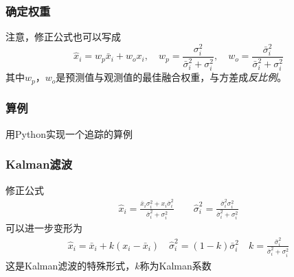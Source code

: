 \documentclass[14pt]{beamer}
\begin{document}
\begin{frame}
  \frametitle{确定权重}
  注意，修正公式也可以写成
  $$\hat{x}_i=w_p\bar{x}_i+w_o x_i,\quad
  w_p=\frac{\sigma_i^2}{\bar{\sigma}_i^2+\sigma_i^2},\quad
  w_o=\frac{\bar{\sigma}_i^2}{\bar{\sigma}_i^2+\sigma_i^2}$$
  其中$w_p$，$w_o$是预测值与观测值的最佳融合权重，与方差成\emph{反比例}。
\end{frame}

\begin{frame}
  \frametitle{算例}
  用Python实现一个追踪的算例
\end{frame}

\begin{frame}
  \frametitle{Kalman滤波}
  修正公式
  \begin{align*}
    \hat{x}_i = \frac{\bar{x}_i\sigma_i^2+x_i\bar{\sigma}_i^2}
    {\bar{\sigma}_i^2+\sigma_i^2}\qquad\hat{\sigma}_i^2=
    \frac{\bar{\sigma}_i^2\sigma_i^2}{\bar{\sigma}_i^2+\sigma_i^2}
  \end{align*}
  可以进一步变形为
  \begin{align*}
    \hat{x}_i=\bar{x}_i+k(x_i-\bar{x}_i)\quad
    \hat{\sigma}_i^2=(1-k)\bar{\sigma}_i^2\quad
    k=\frac{\bar{\sigma}_i^2}{\bar{\sigma}_i^2+\sigma^2_i}
  \end{align*}
  这是Kalman滤波的特殊形式，$k$称为Kalman系数
\end{frame}
\end{document}
